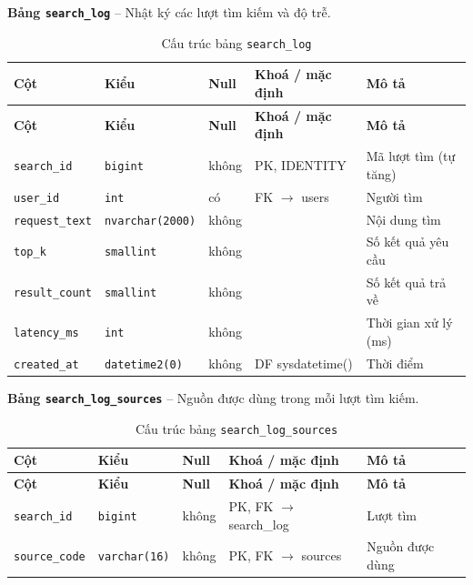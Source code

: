 \textbf{Bảng \texttt{search\_log}} -- Nhật ký các lượt tìm kiếm và độ trễ.

\setlength{\tabcolsep}{4pt}
\begin{longtable}{>{\raggedright\arraybackslash}p{}>{\raggedright\arraybackslash}p{}>{\centering\arraybackslash}p{}>{\raggedright\arraybackslash}p{}>{\raggedright\arraybackslash}p{}}
\caption{Cấu trúc bảng \texttt{search\_log}}\label{tab:col_search_log}\\
\toprule \textbf{Cột} & \textbf{Kiểu} & \textbf{Null} & \textbf{Khoá / mặc định} & \textbf{Mô tả} \\ \midrule \endfirsthead
\toprule \textbf{Cột} & \textbf{Kiểu} & \textbf{Null} & \textbf{Khoá / mặc định} & \textbf{Mô tả} \\ \midrule \endhead
\bottomrule \endfoot
\texttt{search\_id} & {\footnotesize\texttt{bigint}} & không & PK, IDENTITY & Mã lượt tìm (tự tăng) \\
\texttt{user\_id} & {\footnotesize\texttt{int}} & có & FK $\rightarrow$ users & Người tìm \\
\texttt{request\_text} & {\footnotesize\texttt{nvarchar(2000)}} & không &  & Nội dung tìm \\
\texttt{top\_k} & {\footnotesize\texttt{smallint}} & không &  & Số kết quả yêu cầu \\
\texttt{result\_count} & {\footnotesize\texttt{smallint}} & không &  & Số kết quả trả về \\
\texttt{latency\_ms} & {\footnotesize\texttt{int}} & không &  & Thời gian xử lý (ms) \\
\texttt{created\_at} & {\footnotesize\texttt{datetime2(0)}} & không & DF sysdatetime() & Thời điểm \\
\end{longtable}

\textbf{Bảng \texttt{search\_log\_sources}} -- Nguồn được dùng trong mỗi lượt tìm kiếm.

\setlength{\tabcolsep}{4pt}
\begin{longtable}{>{\raggedright\arraybackslash}p{}>{\raggedright\arraybackslash}p{}>{\centering\arraybackslash}p{}>{\raggedright\arraybackslash}p{}>{\raggedright\arraybackslash}p{}}
\caption{Cấu trúc bảng \texttt{search\_log\_sources}}\label{tab:col_search_log_sources}\\
\toprule \textbf{Cột} & \textbf{Kiểu} & \textbf{Null} & \textbf{Khoá / mặc định} & \textbf{Mô tả} \\ \midrule \endfirsthead
\toprule \textbf{Cột} & \textbf{Kiểu} & \textbf{Null} & \textbf{Khoá / mặc định} & \textbf{Mô tả} \\ \midrule \endhead
\bottomrule \endfoot
\texttt{search\_id} & {\footnotesize\texttt{bigint}} & không & PK, FK $\rightarrow$ search\_log & Lượt tìm \\
\texttt{source\_code} & {\footnotesize\texttt{varchar(16)}} & không & PK, FK $\rightarrow$ sources & Nguồn được dùng \\
\end{longtable}

